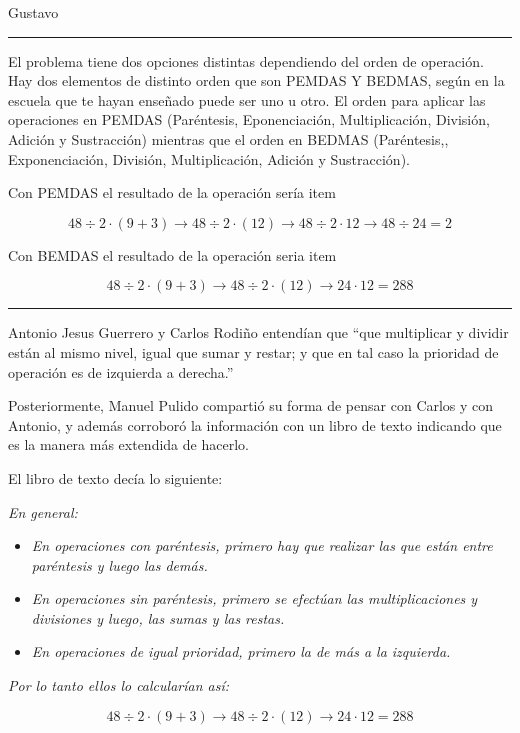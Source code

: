 \begin{opin}{\guscolor}{Gustavo}
\begin{center}\rule{200pt}{0.2pt}\end{center}

El problema tiene dos opciones distintas dependiendo del orden de operación. Hay dos elementos de distinto orden que son PEMDAS Y BEDMAS, según en la escuela que te hayan enseñado puede ser uno u otro. El orden para aplicar las operaciones en PEMDAS (Paréntesis, Eponenciación, Multiplicación, División, Adición y Sustracción) mientras que el orden en BEDMAS (Paréntesis,, Exponenciación, División, Multiplicación, Adición y Sustracción). 

Con PEMDAS el resultado de la operación sería item 

\[
48÷2·(9+3) \to 48 ÷ 2·(12) \to 48÷2·12 \to 48÷24 = 2
\]

Con BEMDAS  el resultado de la operación seria item 

\[
48÷2·(9+3) \to 48 ÷ 2·(12) \to 24·12 = 288
\]

\begin{center}\rule{200pt}{0.2pt}\end{center}


Antonio Jesus Guerrero y Carlos Rodiño entendían que “que multiplicar y dividir están al mismo nivel, igual que sumar y restar; y que en tal caso la prioridad de operación es de izquierda a derecha.”

Posteriormente, Manuel Pulido compartió su forma de pensar con Carlos y con Antonio,  y además corroboró la información con un libro de texto indicando que es la manera más extendida de hacerlo.

El libro de texto decía lo siguiente:

\textit{En general:}

\begin{itemize}
\item \textit{En operaciones con paréntesis, primero hay que realizar las que están entre paréntesis y luego las demás.}
\item \textit{En operaciones sin paréntesis, primero se efectúan las multiplicaciones y divisiones y luego, las sumas y las restas.}
\item \textit{En operaciones de igual prioridad, primero la de más a la izquierda.}
\end{itemize}

\textit{Por lo tanto ellos lo calcularían así:}

\[
48÷2·(9+3) \to 48 ÷ 2·(12) \to 24·12 = 288
\]




\end{opin}
